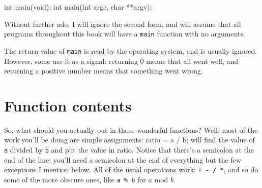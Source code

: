 \documentclass[12pt]{article}
\begin{document}
int main(void);
int main(int argc, char **argv);

Without further ado, I will ignore the second form, and will assume that all programs throughout this
book will have a {\tt main} function with no arguments.

The return value of {\tt main} is read by the operating system, and is usually ignored. However, some
use it as a signal:  returning 0 means that all went well, and returning a positive number means that
something went wrong.



\section{Function contents}

So, what should you actually put in those wonderful functions? Well, most of the work you'll be doing are
simple assignments:    \index{=}
ratio = a / b; 
will find the value of {\tt a} divided by {\tt b} and put the value in ratio. Notice that there's a
semicolon at the end of the line; you'll need a semicolon at the end of everything but the few
exceptions I mention below. All of the usual operations work: {\tt + - / *}, and so do some of the more
obscure ones, like {\tt a \% b} for $a$ mod $b$.  \index{\%}
\end{document}
